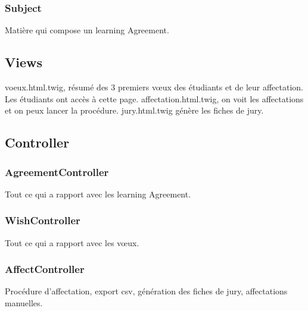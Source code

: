 \subsubsection{Subject}
Matière qui compose un learning Agreement.

\subsection{Views}
voeux.html.twig, résumé des 3 premiers vœux des étudiants et de leur affectation. Les étudiants ont accès à cette page.
affectation.html.twig, on voit les affectations et on peux lancer la procédure.
jury.html.twig génère les fiches de jury.

\subsection{Controller}
\subsubsection{AgreementController}
Tout ce qui a rapport avec les learning Agreement.

\subsubsection{WishController}
Tout ce qui a rapport avec les vœux.

\subsubsection{AffectController}
Procédure d'affectation, export csv, génération des fiches de jury, affectations manuelles.

